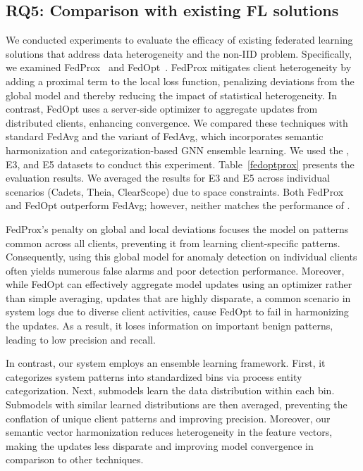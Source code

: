

\subsection{RQ5: Comparison with existing FL solutions}
\label{sec:fedalternatives}

We conducted experiments to evaluate the efficacy of existing federated learning solutions that address data heterogeneity and the non-IID problem. Specifically, we examined FedProx~\cite{li2020federated} and FedOpt~\cite{asad2020fedopt}. FedProx mitigates client heterogeneity by adding a proximal term to the local loss function, penalizing deviations from the global model and thereby reducing the impact of statistical heterogeneity. In contrast, FedOpt uses a server-side optimizer to aggregate updates from distributed clients, enhancing convergence. We compared these techniques with standard FedAvg and the \Sys variant of FedAvg, which incorporates semantic harmonization and categorization-based GNN ensemble learning. We used the \optc, E3, and E5 datasets to conduct this experiment. Table~\ref{fedoptprox} presents the evaluation results. We averaged the results for E3 and E5 across individual scenarios (Cadets, Theia, ClearScope) due to space constraints. Both FedProx and FedOpt outperform FedAvg; however, neither matches the performance of \Sys.

FedProx's penalty on global and local deviations focuses the model on patterns common across all clients, preventing it from learning client-specific patterns. Consequently, using this global model for anomaly detection on individual clients often yields numerous false alarms and poor detection performance. Moreover, while FedOpt can effectively aggregate model updates using an optimizer rather than simple averaging, updates that are highly disparate, a common scenario in system logs due to diverse client activities, cause FedOpt to fail in harmonizing the updates. As a result, it loses information on important benign patterns, leading to low precision and recall.

In contrast, our system employs an ensemble learning framework. First, it categorizes system patterns into standardized bins via process entity categorization. Next, \gnnshort submodels learn the data distribution within each bin. Submodels with similar learned distributions are then averaged, preventing the conflation of unique client patterns and improving precision. Moreover, our semantic vector harmonization reduces heterogeneity in the \gnnshort feature vectors, making the updates less disparate and improving model convergence in comparison to other techniques.


